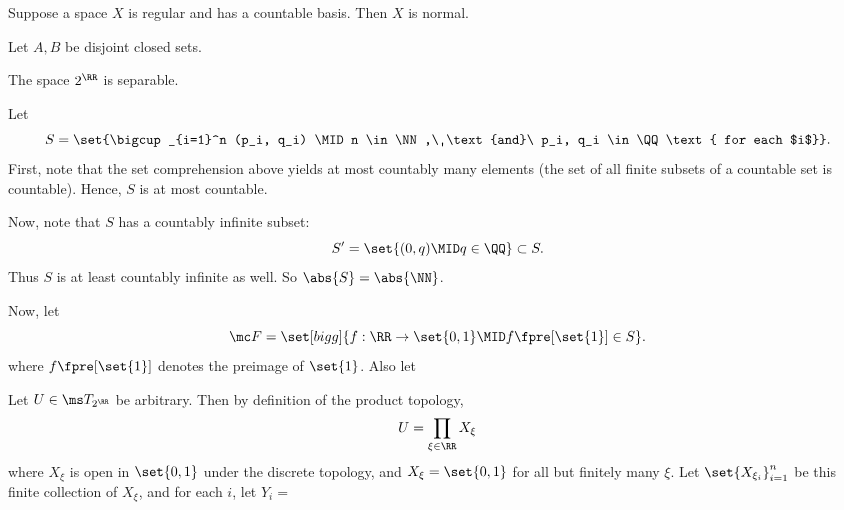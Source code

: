 \documentclass{fkpset}
\begin{document}

  \begin{problem}[5.32]
    Suppose a space $X$ is regular and has a countable basis. Then $X$
    is normal.
  \end{problem}
  \begin{solution}
    Let $A,B$ be disjoint closed sets.
  \end{solution}
  \clearpage

  \begin{problem}[6.6]
    The space $2^\RR$ is separable.
  \end{problem}
  \begin{solution}
    \begin{leftbar}
      Let
      \[
        S = \set{\bigcup_{i=1}^n (p_i, q_i) \MID n \in \NN,\
          \text{and}\ p_i, q_i \in \QQ \text{ for each $i$}}.
      \]
      First, note that the set comprehension above yields at most
      countably many elements (the set of all finite subsets of a
      countable set is countable). Hence, $S$ is at most countable.

      Now, note that $S$ has a countably infinite subset:
      \[
        S' = \set{(0,q) \MID q \in \QQ} \subset S.
      \]
      Thus $S$ is at least countably infinite as well. So $\abs{S} =
      \abs{\NN}$. \cmark
    \end{leftbar}
    Now, let
    \[
      \mc F = \set[bigg]{f : \RR \to \set{0,1} \MID f\fpre[\set{1}]
        \in S}.
    \]
    where $f\fpre[\set{1}]$ denotes the preimage of $\set{1}$. Also
    let


    Let $U \in \ms T_{2^\RR}$ be arbitrary. Then by definition of the
    product topology,
    \[
      U = \prod_{\xi\in \RR} X_\xi
    \]
    where $X_\xi$ is open in $\set{0,1}$ under the discrete topology,
    and $X_\xi = \set{0,1}$ for all but finitely many $\xi$. Let
    $\set{X_{\xi_i}}_{i=1}^n$ be this finite collection of $X_\xi$,
    and for each $i$, let $Y_i = $
  \end{solution}
  \clearpage
\end{document}
